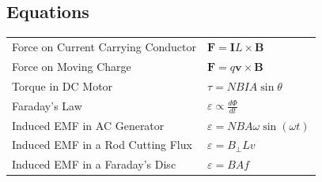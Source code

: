 \documentclass[a4paper,11pt]{article}
\begin{document}
	\subsection{Equations}
	\begin{center}
		\renewcommand{\arraystretch}{1.2}
		\begin{tabular}{@{} l l @{}} %
			\toprule
			Force on Current Carrying Conductor & $\textbf{F} = \textbf{I}L\times\textbf{B}$\\
			Force on Moving Charge & $\textbf{F} = q\textbf{v}\times\textbf{B}$\\
			Torque in DC Motor & $\tau = NBIA\sin\theta$\\
			Faraday's Law & $\varepsilon \propto \frac{d\Phi}{dt}$\\
			Induced EMF in AC Generator & $\varepsilon = NBA\omega\sin\left(\omega t\right)$\\
			Induced EMF in a Rod Cutting Flux & $\varepsilon = B_\perp Lv$\\
			Induced EMF in a Faraday's Disc & $\varepsilon = BAf$\\
			\bottomrule
		\end{tabular}
	\end{center}
\end{document}
